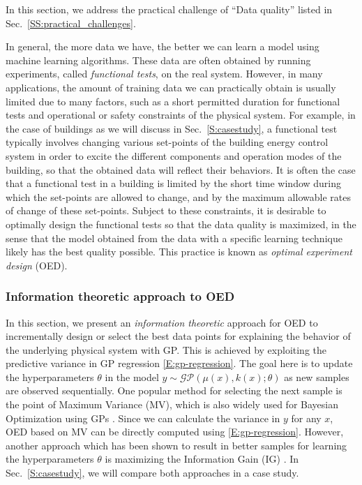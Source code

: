 
In this section, we address the practical challenge of ``Data quality'' listed in Sec.~\ref{SS:practical_challenges}.

In general, the more data we have, the better we can learn a model using machine learning algorithms.
These data are often obtained by running experiments, called \emph{functional tests}, on the real system.
However, in many applications, the amount of training data we can practically obtain is usually limited due to many factors, such as a short permitted duration for functional tests and operational or safety constraints of the physical system.
For example, in the case of buildings as we will discuss in Sec.~\ref{S:casestudy}, a functional test typically involves changing various set-points of the building energy control system in order to excite the different components and operation modes of the building, so that the obtained data will reflect their behaviors.
It is often the case that a functional test in a building is limited by the short time window during which the set-points are allowed to change, and by the maximum allowable rates of change of these set-points.
Subject to these constraints, it is desirable to optimally design the functional tests so that the data quality is maximized, in the sense that the model obtained from the data with a specific learning technique likely has the best quality possible.
This practice is known as \emph{optimal experiment design} (OED).


\subsubsection{Information theoretic approach to OED}

In this section, we present an \emph{information theoretic} approach for OED to incrementally design or select the best data points for explaining the behavior of the underlying physical system with GP.
This is achieved by exploiting the predictive variance in GP regression \eqref{E:gp-regression}.
The goal here is to update the hyperparameters \(\theta\) in the model \(y \sim \mathcal{GP}(\mu(x), k(x); \theta)\) as new samples are observed sequentially.
One popular method for selecting the next sample is the point of Maximum Variance (MV), which is also widely used for Bayesian Optimization using GPs \cite{Snoek2012}.
Since we can calculate the variance in \(y\) for any \(x\), OED based on MV can be directly computed using \eqref{E:gp-regression}.
However, another approach which has been shown to result in better samples for learning the hyperparameters \(\theta\) is maximizing the Information Gain (IG) \cite{Krause2008}. In Sec.~\ref{S:casestudy}, we will compare both approaches in a case study.

